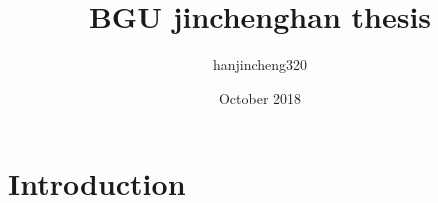 \documentclass{article}
\title{BGU jinchenghan thesis}
\author{hanjincheng320 }
\date{October 2018}
\begin{document}
\maketitle

\section{Introduction}
\end{document}
